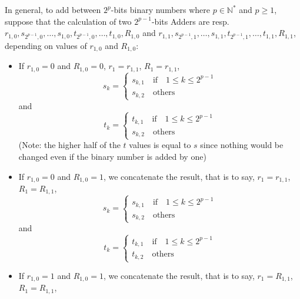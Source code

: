 \documentclass[conference]{IEEEtran}
\begin{document}
In general, to add between $2^p$-bits binary numbers where $p \in \mathbb{N}^*$ and $p \geq 1$, suppose that the calculation of two $2^{p-1}$-bits Adders are resp. $r_{1,0}, s_{2^{p-1},0}, \dots, s_{1,0}, t_{2^{p-1}, 0}, \dots, t_{1,0}, R_{1,0}$ and $r_{1,1},  s_{2^{p-1},1}, \dots, s_{1,1}, t_{2^{p-1}, 1}, \dots, t_{1,1}, R_{1,1}$, depending on values of $r_{1,0}$ and $R_{1,0}$:
\begin{itemize}
    \item If $r_{1,0}=0$ and $R_{1,0}=0$, $r_1 = r_{1,1}$, $R_1 = r_{1,1}$,
    \begin{equation}
        s_k = \begin{cases}
            s_{k,1} \quad \text{if} \quad 1 \leq k \leq 2^{p-1} \\
            s_{k,2} \quad \text{others}
        \end{cases}
    \end{equation}
    and
    \begin{equation}
        t_k = \begin{cases}
            t_{k,1} \quad \text{if} \quad 1 \leq k \leq 2^{p-1} \\
            s_{k,2} \quad \text{others}
        \end{cases}
    \end{equation}
    (Note: the higher half of the $t$ values is equal to $s$ since nothing would be changed even if the binary number is added by one)
    \item If $r_{1,0}=0$ and $R_{1,0}=1$, we concatenate the result, that is to say, $r_1 = r_{1,1}$, $R_1 = R_{1,1}$,
    \begin{equation}
        s_k = \begin{cases}
            s_{k,1} \quad \text{if} \quad 1 \leq k \leq 2^{p-1} \\
            s_{k,2} \quad \text{others}
        \end{cases}
    \end{equation}
    and
    \begin{equation}
        t_k = \begin{cases}
            t_{k,1} \quad \text{if} \quad 1 \leq k \leq 2^{p-1} \\
            t_{k,2} \quad \text{others}
        \end{cases}
    \end{equation} 
    \item If $r_{1,0}=1$ and $R_{1,0}=1$, we concatenate the result, that is to say, $r_1 = R_{1,1}$, $R_1 = R_{1,1}$,

\end{itemize}
\end{document}
